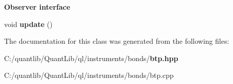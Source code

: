 \begin{Indent}{\bf Observer interface}\par
\begin{DoxyCompactItemize}
\item 
void {\bfseries update} ()\label{class_quant_lib_1_1_rendistato_basket_a851be9190e18602d4787671c01d219a5}

\end{DoxyCompactItemize}
\end{Indent}


The documentation for this class was generated from the following files\+:\begin{DoxyCompactItemize}
\item 
C\+:/quantlib/\+Quant\+Lib/ql/instruments/bonds/{\bf btp.\+hpp}\item 
C\+:/quantlib/\+Quant\+Lib/ql/instruments/bonds/btp.\+cpp\end{DoxyCompactItemize}
